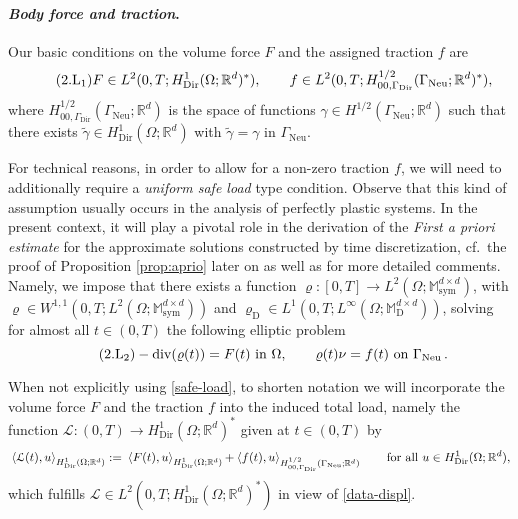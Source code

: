 \documentclass[a4paper,10pt,reqno]{amsart}
\numberwithin{equation}{section}
\newcommand{\bbM}{\mathbb{M}}
\newcommand{\R}{\mathbb{R}}
\numberwithin{equation}{section}
\newcommand{\pairing}[4]{ \sideset{_{ #1 }}{_{ #2 }}  {\mathop{\langle #3 , #4
\rangle}}}
\newcommand{\Dir}{\mathrm{Dir}}
\newcommand{\Neu}{\mathrm{Neu}}
\newcommand{\mt}{\bbM}
\newcommand{\sym}{\mathrm{sym}}
\newcommand{\dev}{\mathrm{D}}
\begin{document}
\paragraph{{\em Body force and traction}.}
Our basic conditions on the volume force $F$ and the assigned traction $f$ are
 \begin{equation}
\label{data-displ}
 \tag{2.$\mathrm{L}_1$}
F\in L^2(0,T; H_\Dir^1(\Omega;\R^d)^*), \qquad f \in L^2(0,T; H_{00,\Gamma_\Dir}^{1/2}(\Gamma_\Neu; \R^d)^*),
\end{equation}
where $ H_{00,\Gamma_\Dir}^{1/2}(\Gamma_\Neu; \R^d)$ is the space of functions $\gamma \in H^{1/2} (\Gamma_\Neu;\R^d)$ such that there exists $\tilde\gamma \in H_\Dir^1(\Omega;\R^d)$ with $\tilde\gamma = \gamma $ in $\Gamma_\Neu$.
\par
For technical reasons,   in order to allow for a non-zero traction $f$, %
we will need to additionally require  a  \emph{uniform safe load} type condition. Observe that  this kind of assumption
 usually occurs in the analysis of perfectly plastic systems. %
 In the present context, it will play a pivotal role in the derivation of the \emph{First a priori estimate}  for the approximate solutions 
 constructed by time discretization, cf.\ the proof of Proposition  \ref{prop:aprio} later on as well as \cite[Rmk.\ 4.4]{Rossi2016} for more detailed comments.
 Namely, we impose that there exists a function $\varrho: [0,T] \to L^2(\Omega;\mt_\sym^{d\times d})$,
with $\varrho \in W^{1,1}(0,T;  L^2(\Omega;\mt_\sym^{d\times d}))  $ and $  \varrho_\dev \in L^1(0,T;L^\infty (\Omega; \mt_\dev^{d\times d}))$,
 solving for almost all $t\in (0,T)$ the following elliptic problem %
\begin{equation}
\label{safe-load}
 \tag{2.$\mathrm{L}_2$}
- \mathrm{div}(\varrho(t)) = F(t)  \text{ in } \Omega, \qquad 
\varrho(t) \nu = f(t)  \text{ on } \Gamma_\Neu\,.
\end{equation}
\par
 When not explicitly using \eqref{safe-load}, to shorten notation we will incorporate the volume force $F$ and the traction $f$
  into the induced  total load, namely the function
$\mathcal{L}: (0,T) \to H_\Dir^1(\Omega;\R^d)^*$ given at $t\in (0,T)$ by 
\begin{equation}
\label{total-load}
\pairing{}{H_\Dir^1(\Omega;\R^d)}{\mathcal{L}(t)}{u}: = \pairing{}{H_\Dir^1(\Omega;\R^d)}{F(t)}{u} + \pairing{}{H_{00,\Gamma_\Dir}^{1/2}(\Gamma_\Neu; \R^d)}{f(t)}{u} \qquad \text{for all } u \in H_\Dir^1(\Omega;\R^d),
\end{equation} 
which fulfills $\mathcal{L} \in L^2(0,T; H_\Dir^1(\Omega;\R^d)^*)$ in view of \eqref{data-displ}.
\end{document}
